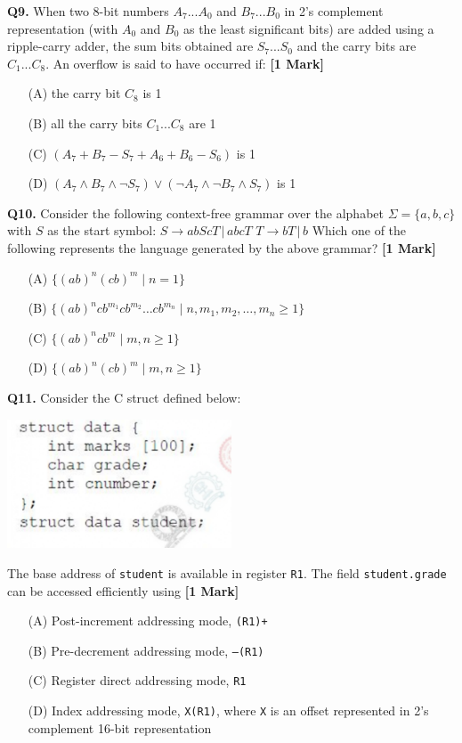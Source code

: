 \documentclass[11pt]{article}
\newcommand{\questiona}[2]{
    \noindent\textbf{Q#2.} #1 \hfill \textbf{[1 Mark]}
}
\begin{document}
\questiona{When two 8-bit numbers \( A_7...A_0 \) and \( B_7...B_0 \) in 2’s complement representation (with \( A_0 \) and \( B_0 \) as the least significant bits) are added using a ripple-carry adder, the sum bits obtained are \( S_7...S_0 \) and the carry bits are \( C_1...C_8 \). An overflow is said to have occurred if:}{9}
\begin{enumerate}
    \item[(A)] the carry bit \( C_8 \) is 1  
    \item[(B)] all the carry bits \( C_1...C_8 \) are 1  
    \item[(C)] \( (A_7 + B_7 - S_7 + A_6 + B_6 - S_6) \) is 1  
    \item[(D)] \( (A_7 \land B_7 \land \neg S_7) \lor (\neg A_7 \land \neg B_7 \land S_7) \) is 1  
\end{enumerate}
\vspace{0.5cm}

\questiona{Consider the following context-free grammar over the alphabet \( \Sigma = \{a, b, c\} \) with \( S \) as the start symbol:  
\( S \rightarrow abScT \,|\, abcT \)  
\( T \rightarrow bT \,|\, b \)  
Which one of the following represents the language generated by the above grammar?}{10}
\begin{enumerate}
    \item[(A)] \( \{(ab)^n(cb)^m \mid n = 1\} \)  
    \item[(B)] \( \{(ab)^n cb^{m_1} cb^{m_2} \ldots cb^{m_n} \mid n, m_1, m_2, \ldots, m_n \geq 1\} \)  
    \item[(C)] \( \{(ab)^n cb^m \mid m, n \geq 1\} \)  
    \item[(D)] \( \{(ab)^n (cb)^m \mid m, n \geq 1\} \)  
\end{enumerate}
\vspace{0.5cm}

\questiona{Consider the C struct defined below:  
\begin{center}
\includegraphics[width=0.5\textwidth]{figures/11.png}
\end{center}
The base address of \texttt{student} is available in register \texttt{R1}. The field \texttt{student.grade} can be accessed efficiently using}{11}
\begin{enumerate}
    \item[(A)] Post-increment addressing mode, \texttt{(R1)+}  
    \item[(B)] Pre-decrement addressing mode, \texttt{--(R1)}  
    \item[(C)] Register direct addressing mode, \texttt{R1}  
    \item[(D)] Index addressing mode, \texttt{X(R1)}, where \texttt{X} is an offset represented in 2’s complement 16-bit representation  
\end{enumerate}
\vspace{0.5cm}
\end{document}
